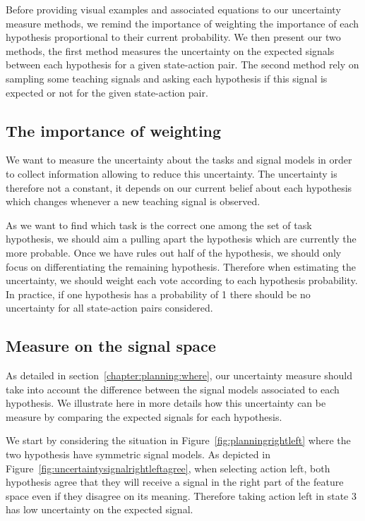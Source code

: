 Before providing visual examples and associated equations to our uncertainty measure methods, we remind the importance of weighting the importance of each hypothesis proportional to their current probability. We then present our two methods, the first method measures the uncertainty on the expected signals between each hypothesis for a given state-action pair. The second method rely on sampling some teaching signals and asking each hypothesis if this signal is expected or not for the given state-action pair.

\subsection{The importance of weighting}

We want to measure the uncertainty about the tasks and signal models in order to collect information allowing to reduce this uncertainty. The uncertainty is therefore not a constant, it depends on our current belief about each hypothesis which changes whenever a new teaching signal is observed.

As we want to find which task is the correct one among the set of task hypothesis, we should aim a pulling apart the hypothesis which are currently the more probable. Once we have rules out half of the hypothesis, we should only focus on differentiating the remaining hypothesis. Therefore when estimating the uncertainty, we should weight each vote according to each hypothesis probability. In practice, if one hypothesis has a probability of 1 there should be no uncertainty for all state-action pairs considered.

\subsection{Measure on the signal space}
\label{chapter:planning:uncertaintysignalspace}

As detailed in section~\ref{chapter:planning:where}, our uncertainty measure should take into account the difference between the signal models associated to each hypothesis. We illustrate here in more details how this uncertainty can be measure by comparing the expected signals for each hypothesis.

We start by considering the situation in Figure~\ref{fig:planningrightleft} where the two hypothesis have symmetric signal models. As depicted in Figure~\ref{fig:uncertaintysignalrightleftagree}, when selecting action left, both hypothesis agree that they will receive a signal in the right part of the feature space even if they disagree on its meaning. Therefore taking action left in state 3 has low uncertainty on the expected signal.

